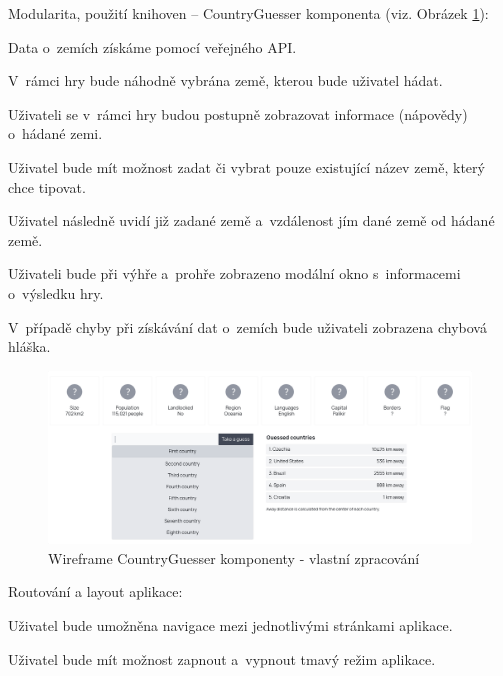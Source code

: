 \begin{citemize}
	\item Modularita, použití knihoven -- CountryGuesser komponenta (viz. Obrázek \ref{fig:countryguesserwireframe}):
	
	\begin{cenumerate}
		\item Data o~zemích získáme pomocí veřejného API.
		\item V~rámci hry bude náhodně vybrána země, kterou bude uživatel hádat.
		\item Uživateli se v~rámci hry budou postupně zobrazovat informace (nápovědy) o~hádané zemi.
		\item Uživatel bude mít možnost zadat či vybrat pouze existující název země, který chce tipovat.
		\item Uživatel následně uvidí již zadané země a~vzdálenost jím dané země od hádané země.
		\item Uživateli bude při výhře a~prohře zobrazeno modální okno s~informacemi o~výsledku hry.
		\item V~případě chyby při získávání dat o~zemích bude uživateli zobrazena chybová hláška.
	\end{cenumerate}

	\begin{figure}[htb]
		\centering
			\includegraphics[width=1\textwidth]{images/CountryGuesser-wireframe.png}
		\caption[Wireframe CountryGuesser komponenty]{Wireframe CountryGuesser komponenty - vlastní zpracování}
		\label{fig:countryguesserwireframe}
	\end{figure}

	\item Routování a layout aplikace:
	
	\begin{cenumerate}
		\item Uživatel bude umožněna navigace mezi jednotlivými stránkami aplikace.
		\item Uživatel bude mít možnost zapnout a~vypnout tmavý režim aplikace.
	\end{cenumerate}
\end{citemize}


